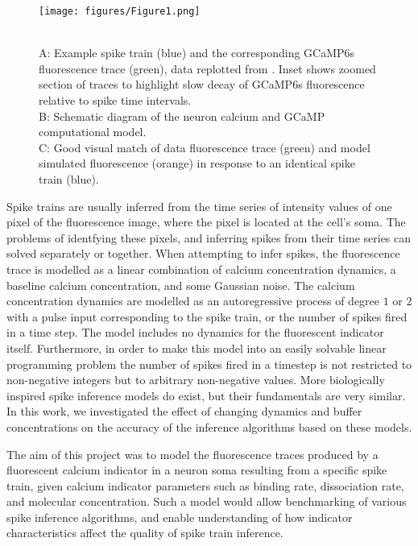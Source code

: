 \documentclass[a4paper,12pt]{article}
\theoremstyle{definition}
\begin{document}
\begin{figure}[h]
    \centering
    \texttt{[image: figures/Figure1.png]}
  \caption{\\ A: Example spike train (blue) and the corresponding GCaMP6s fluorescence trace (green), data replotted from \cite{berens}. Inset shows zoomed section of traces to highlight slow decay of GCaMP6s fluorescence relative to spike time intervals.\\
  B: Schematic diagram of the neuron calcium and GCaMP computational model.\\
  C: Good visual match of data fluorescence trace (green) and model simulated fluorescence (orange) in response to an identical spike train (blue).}
  \label{fig:spike_finder_example}
\end{figure}

Spike trains are usually inferred from the time series of intensity values of one pixel of the fluorescence image, where the pixel is located at the cell's soma. The problems of identfying these pixels, and inferring spikes from their time series can solved separately or together. When attempting to infer spikes, the fluorescence trace is modelled as a linear combination of calcium concentration dynamics, a baseline calcium concentration, and some Gaussian noise. The calcium concentration dynamics are modelled as an autoregressive process of degree $1$ or $2$ with a pulse input corresponding to the spike train, or the number of spikes fired in a time step. The model includes no dynamics for the fluorescent indicator itself. Furthermore, in order to make this model into an easily solvable linear programming problem the number of spikes fired in a timestep is not restricted to non-negative integers but to arbitrary non-negative values\cite{vogelstein, pnevmatikakis, friedrich, paninski1, paninski2}. More biologically inspired spike inference models do exist\cite{deneux}, but their fundamentals are very similar. In this work, we investigated the effect of changing dynamics and buffer concentrations on the accuracy of the inference algorithms based on these models.

The aim of this project was to model the fluorescence traces produced by a fluorescent calcium indicator in a neuron soma resulting from a specific spike train, given calcium indicator parameters such as binding rate, dissociation rate, and molecular concentration. Such a model would allow benchmarking of various spike inference algorithms, and enable understanding of how indicator characteristics affect the quality of spike train inference.
\end{document}
